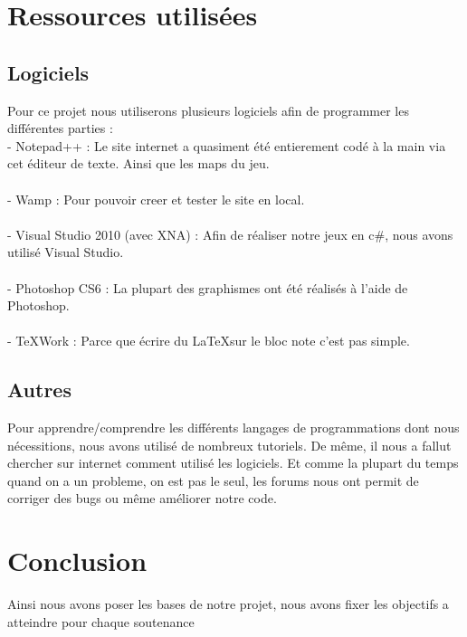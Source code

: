 \documentclass [11pt]{report}
\begin{document}
\chapter {Ressources utilisées}
	\section {Logiciels}

	Pour ce projet nous utiliserons plusieurs logiciels afin de programmer les différentes parties :\\

	- Notepad++ : Le site internet a quasiment été entierement codé à la main via cet éditeur de texte. Ainsi que les maps du jeu.\\\\\indent
	- Wamp : Pour pouvoir creer et tester le site en local.\\\\\indent
	- Visual Studio 2010 (avec XNA) : Afin de réaliser notre jeux en c\#, nous avons utilisé Visual Studio.\\\\\indent
	- Photoshop CS6 : La plupart des graphismes ont été réalisés à l'aide de Photoshop.\\\\\indent
	- TeXWork : Parce que écrire du \LaTeX sur le bloc note c'est pas simple.\\\vspace{10mm}



	\section {Autres}

	Pour apprendre/comprendre les différents langages de programmations dont nous nécessitions, nous avons utilisé de nombreux tutoriels. De même, il nous a fallut chercher sur internet comment utilisé les logiciels. Et comme la plupart du temps quand on a un probleme, on est pas le seul, les forums nous ont permit de corriger des bugs ou même améliorer notre code.




\chapter {Conclusion}
	Ainsi nous avons poser les bases de notre projet, nous avons fixer les objectifs a atteindre pour chaque soutenance
\end{document}
